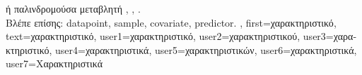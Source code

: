 {{		\foreignlanguage{greek}{ή} \guillemotleft \foreignlanguage{greek}{παλινδρομούσα μεταβλητή}\guillemotright
		\cite{Gujarati2021}, \cite{Dodge2003}, \cite{Everitt2022}.
		\\
		\foreignlanguage{greek}{Βλέπε επίσης:} \gls{datapoint}, \gls{sample}, \gls{covariate}, \gls{predictor}. }, 
	first={\foreignlanguage{greek}{χαρακτηριστικό}},
	text={\foreignlanguage{greek}{χαρακτηριστικό}},
	user1={\foreignlanguage{greek}{χαρακτηριστικό}}, %
	user2={\foreignlanguage{greek}{χαρακτηριστικού}}, %
	user3={\foreignlanguage{greek}{χαρακτηριστικό}}, %
	user4={\foreignlanguage{greek}{χαρακτηριστικά}}, %
	user5={\foreignlanguage{greek}{χαρακτηριστικών}}, %
	user6={\foreignlanguage{greek}{χαρακτηριστικά}}, %
	user7={\foreignlanguage{greek}{Χαρακτηριστικά}} %
}

